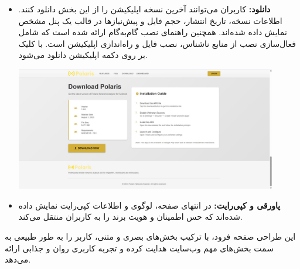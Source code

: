 \begin{itemize}
\begin{itemize}
            \item \textbf{دانلود:}  
            کاربران می‌توانند آخرین نسخه اپلیکیشن  را از این بخش دانلود کنند. اطلاعات نسخه، تاریخ انتشار، حجم فایل و پیش‌نیازها در قالب یک پنل مشخص نمایش داده شده‌اند. همچنین راهنمای نصب گام‌به‌گام ارائه شده است که شامل فعال‌سازی نصب از منابع ناشناس، نصب فایل  و راه‌اندازی اپلیکیشن است.  با کلیک بر روی دکمه  اپلیکیشن دانلود می‌شود.
            \begin{center}
                \includegraphics[width=0.9\textwidth]{images/fr_download.jpg}
            \end{center}
        
            \item \textbf{پاورقی و کپی‌رایت:}  
            در انتهای صفحه، لوگوی  و اطلاعات کپی‌رایت نمایش داده شده‌اند که حس اطمینان و هویت برند را به کاربران منتقل می‌کند.
        \end{itemize}
        
        این طراحی صفحه فرود، با ترکیب بخش‌های بصری و متنی، کاربر را به طور طبیعی به سمت بخش‌های مهم وب‌سایت هدایت کرده و تجربه کاربری روان و جذابی ارائه می‌دهد.

    \end{itemize}

